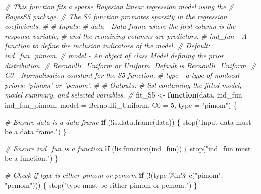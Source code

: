 \documentclass[
  11pt,
]{article}
\newenvironment{Shaded}{}{}
\newcommand{\AttributeTok}[1]{\textcolor[rgb]{0.49,0.56,0.16}{#1}}
\newcommand{\CommentTok}[1]{\textcolor[rgb]{0.38,0.63,0.69}{\textit{#1}}}
\newcommand{\ControlFlowTok}[1]{\textcolor[rgb]{0.00,0.44,0.13}{\textbf{#1}}}
\newcommand{\DecValTok}[1]{\textcolor[rgb]{0.25,0.63,0.44}{#1}}
\newcommand{\FunctionTok}[1]{\textcolor[rgb]{0.02,0.16,0.49}{#1}}
\newcommand{\NormalTok}[1]{#1}
\newcommand{\OtherTok}[1]{\textcolor[rgb]{0.00,0.44,0.13}{#1}}
\newcommand{\SpecialCharTok}[1]{\textcolor[rgb]{0.25,0.44,0.63}{#1}}
\newcommand{\StringTok}[1]{\textcolor[rgb]{0.25,0.44,0.63}{#1}}
\begin{document}
\begin{Shaded}
\begin{Highlighting}[]
\CommentTok{\# This function fits a sparse Bayesian linear regression model using the }
\CommentTok{\#   BayesS5 package. }
\CommentTok{\#   The S5 function promotes sparsity in the regression coefficients.}
\CommentTok{\#}
\CommentTok{\# Inputs:}
\CommentTok{\#     data {-} Data frame where the first column is the response variable, }
\CommentTok{\#            and the remaining columns are predictors.}
\CommentTok{\#     ind\_fun {-} A function to define the inclusion indicators of the model.}
\CommentTok{\#               Default: ind\_fun\_pimom.}
\CommentTok{\#     model {-} An object of class Model defining the prior distribution.}
\CommentTok{\#             Bernoulli\_Uniform or Uniform. Default is Bernoulli\_Uniform.}
\CommentTok{\#     C0 {-} Normalisation constant for the S5 function.}
\CommentTok{\#     type {-} a type of nonlocal priors; ’pimom’ or ’pemom’.}
\CommentTok{\#}
\CommentTok{\# Outputs:}
\CommentTok{\#     list containing the fitted model, model summary, and selected variables.}
\CommentTok{\#}
\NormalTok{fit\_S5 }\OtherTok{\textless{}{-}} \ControlFlowTok{function}\NormalTok{(data, }\AttributeTok{ind\_fun =}\NormalTok{ ind\_fun\_pimom, }\AttributeTok{model =}\NormalTok{ Bernoulli\_Uniform, }
                  \AttributeTok{C0 =} \DecValTok{5}\NormalTok{, }\AttributeTok{type =} \StringTok{"pimom"}\NormalTok{) \{}
  
  \CommentTok{\# Ensure data is a data frame}
  \ControlFlowTok{if}\NormalTok{ (}\SpecialCharTok{!}\FunctionTok{is.data.frame}\NormalTok{(data)) \{}
    \FunctionTok{stop}\NormalTok{(}\StringTok{"Input \textquotesingle{}data\textquotesingle{} must be a data frame."}\NormalTok{)}
\NormalTok{  \}}
  
  \CommentTok{\# Ensure \textquotesingle{}ind\_fun\textquotesingle{} is a function}
  \ControlFlowTok{if}\NormalTok{ (}\SpecialCharTok{!}\FunctionTok{is.function}\NormalTok{(ind\_fun)) \{}
    \FunctionTok{stop}\NormalTok{(}\StringTok{"\textquotesingle{}ind\_fun\textquotesingle{} must be a function."}\NormalTok{)}
\NormalTok{  \}}
  
  \CommentTok{\# Check if \textquotesingle{}type\textquotesingle{} is either \textquotesingle{}pimom\textquotesingle{} or \textquotesingle{}pemom\textquotesingle{}}
  \ControlFlowTok{if}\NormalTok{ (}\SpecialCharTok{!}\NormalTok{(type }\SpecialCharTok{\%in\%} \FunctionTok{c}\NormalTok{(}\StringTok{"pimom"}\NormalTok{, }\StringTok{"pemom"}\NormalTok{))) \{}
    \FunctionTok{stop}\NormalTok{(}\StringTok{"\textquotesingle{}type\textquotesingle{} must be either \textquotesingle{}pimom\textquotesingle{} or \textquotesingle{}pemom\textquotesingle{}."}\NormalTok{)}
\NormalTok{  \}}
  

\end{Highlighting}
\end{Shaded}
\end{document}
